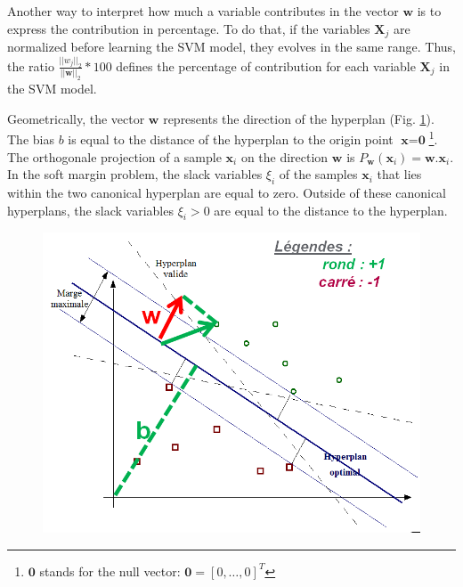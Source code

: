 Another way to interpret how much a variable contributes in the vector $\textbf{w}$ is to express the contribution in percentage. To do that, if the variables $\textbf{X}_j$ are normalized before learning the SVM model, they evolves in the same range. Thus, the ratio $\frac{||w_j||_2}{||\textbf{w}||_2}*100$ defines the percentage of contribution for each variable $\textbf{X}_j$ in the SVM model.

Geometrically, the vector $\textbf{w}$ represents the direction of the hyperplan (Fig. \ref{fig:SVM_interpretation}). The bias $b$ is equal to the distance of the hyperplan to the origin point $\textbf{x}=\textbf{0}$\footnote{$\textbf{0}$ stands for the null vector: $\textbf{0} = [0, \ldots ,0]^T$}. The orthogonale projection of a sample $\textbf{x}_i$ on the direction $\textbf{w}$ is $P_\textbf{w}(\textbf{x}_i) = \textbf{w}.\textbf{x}_i$. In the soft margin problem, the slack variables $\xi_i$ of the samples $\textbf{x}_i$ that lies within the two canonical hyperplan are equal to zero. Outside of these canonical hyperplans, the slack variables $\xi_i > 0$ are equal to the distance to the hyperplan.


\begin{figure}[h!]
	\centering
	\includegraphics[width=0.5\linewidth]{images/SVM_interpretation}
	\caption{}
	\label{fig:SVM_interpretation}
\end{figure}


